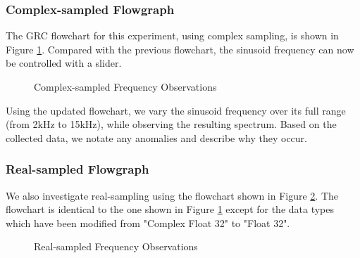 \documentclass{article}
\begin{document}
 
\subsubsection{Complex-sampled Flowgraph \label{subsection::frequency_observations_complex_sampling}}

The GRC flowchart for this experiment, using complex sampling, is shown in Figure \ref{fig::frequency_observations_complex_sampling}. Compared with the previous flowchart, the sinusoid frequency can now be controlled with a slider.

\begin{figure}[H]
	\centerline{}
	\caption{Complex-sampled Frequency Observations}
	\label{fig::frequency_observations_complex_sampling}
\end{figure}

Using the updated flowchart, we vary the sinusoid frequency over its full range (from 2kHz to 15kHz), while observing the resulting spectrum. Based on the collected data, we notate any anomalies and describe why they occur. 

\subsubsection{Real-sampled Flowgraph}

We also investigate real-sampling using the flowchart shown in Figure \ref{fig::frequency_observations_real_sampling}. The flowchart is identical to the one shown in Figure \ref{fig::frequency_observations_complex_sampling} except for the data types which have been modified from "Complex Float 32" to "Float 32".

\begin{figure}[H]
	\centerline{}
	\caption{Real-sampled Frequency Observations}
	\label{fig::frequency_observations_real_sampling}
\end{figure}
\end{document}
